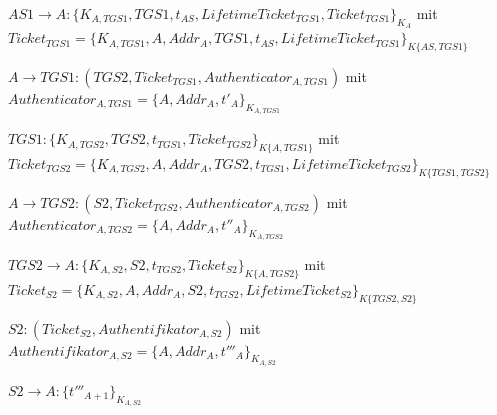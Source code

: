 \documentclass[a4paper]{article}
\begin{document}
\begin{multicols}{3}
\begin{enumerate*}
            \item $AS1\rightarrow A:\{K_{A,TGS1}, TGS1, t_{AS}, LifetimeTicket_{TGS1}, Ticket_{TGS1}\}_{K_A}$ mit $Ticket_{TGS1}=\{K_{A,TGS1}, A, Addr_A, TGS1, t_{AS}, LifetimeTicket_{TGS1}\}_{K\{AS,TGS1\}}$
            \item $A\rightarrow TGS1:(TGS2,Ticket_{TGS1},Authenticator_{A,TGS1})$ mit $Authenticator_{A,TGS1}=\{A,Addr_A,t'_{A}\}_{K_{A,TGS1}}$
            \item $TGS1:\{K_{A,TGS2}, TGS2, t_{TGS1}, Ticket_{TGS2}\}_{K\{A,TGS1\}}$ mit $Ticket_{TGS2}=\{K_{A,TGS2}, A, Addr_A, TGS2, t_{TGS1}, LifetimeTicket_{TGS2}\}_{K\{TGS1,TGS2\}}$
            \item $A\rightarrow TGS2:(S2,Ticket_{TGS2},Authenticator_{A,TGS2})$ mit $Authenticator_{A,TGS2}=\{A,Addr_A,t''_{A}\}_{K_{A,TGS2}}$
            \item $TGS2\rightarrow A:\{K_{A,S2},S2,t_{TGS2},Ticket_{S2}\}_{K\{A,TGS2\}}$ mit $Ticket_{S2}=\{K_{A,S2},A,Addr_A,S2,t_{TGS2}, LifetimeTicket_{S2}\}_{K\{TGS2,S2\}}$
            \item $S2:(Ticket_{S2}, Authentifikator_{A,S2})$ mit $Authentifikator_{A,S2}=\{A,Addr_A,t'''_{A}\}_{K_{A,S2}}$
            \item $S2\rightarrow A:\{t'''_{A+1}\}_{K_{A,S2}}$
      \end{enumerate*}


\end{multicols}
\end{document}

